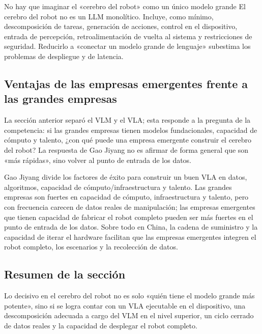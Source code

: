 \begin{warningbox}{No hay que imaginar el «cerebro del robot» como un único modelo grande}
El cerebro del robot no es un LLM monolítico. Incluye, como mínimo, descomposición de tareas, generación de acciones, control en el dispositivo, entrada de percepción, retroalimentación de vuelta al sistema y restricciones de seguridad. Reducirlo a «conectar un modelo grande de lenguaje» subestima los problemas de despliegue y de latencia.
\end{warningbox}

\subsection{Ventajas de las empresas emergentes frente a las grandes empresas}

La sección anterior separó el VLM y el VLA; esta responde a la pregunta de la competencia: si las grandes empresas tienen modelos fundacionales, capacidad de cómputo y talento, ¿con qué puede una empresa emergente construir el cerebro del robot? La respuesta de Gao Jiyang no es afirmar de forma general que son «más rápidas», sino volver al punto de entrada de los datos.

Gao Jiyang divide los factores de éxito para construir un buen VLA en datos, algoritmos, capacidad de cómputo/infraestructura y talento. Las grandes empresas son fuertes en capacidad de cómputo, infraestructura y talento, pero con frecuencia carecen de datos reales de manipulación; las empresas emergentes que tienen capacidad de fabricar el robot completo pueden ser más fuertes en el punto de entrada de los datos. Sobre todo en China, la cadena de suministro y la capacidad de iterar el hardware facilitan que las empresas emergentes integren el robot completo, los escenarios y la recolección de datos.

\subsection{Resumen de la sección}

Lo decisivo en el cerebro del robot no es solo «quién tiene el modelo grande más potente», sino si se logra contar con un VLA ejecutable en el dispositivo, una descomposición adecuada a cargo del VLM en el nivel superior, un ciclo cerrado de datos reales y la capacidad de desplegar el robot completo.
